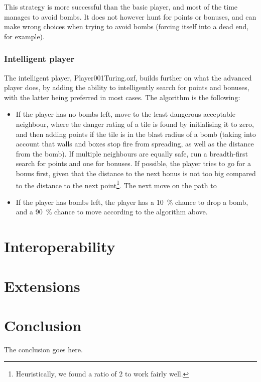 \documentclass[12pt,journal]{IEEEtran}
\newcommand{\ntt}{\normalfont\ttfamily}
\newcommand{\fn}[1]{{\protect\ntt#1}}
\begin{document}
This strategy is more successful than the basic player, and most of the time manages to avoid bombs.
It does not however hunt for points or bonuses, and can make wrong choices when trying to avoid bombs (forcing itself into a dead end, for example).

\subsubsection{Intelligent player}
The intelligent player, \fn{Player001Turing.ozf}, builds further on what the advanced player does, by adding the ability to intelligently search for points and bonuses, with the latter being preferred in most cases.
The algorithm is the following:
\begin{itemize}
	\item If the player has no bombs left, move to the least dangerous acceptable neighbour, where the danger rating of a tile is found by initialising it to zero, and then adding points if the tile is in the blast radius of a bomb (taking into account that walls and boxes stop fire from spreading, as well as the distance from the bomb).
	If multiple neighbours are equally safe, run a breadth-first search for points and one for bonuses.
	If possible, the player tries to go for a bonus first, given that the distance to the next bonus is not too big compared to the distance to the next point\footnote{Heuristically, we found a ratio of \(2\) to work fairly well.}.
	The next move on the path to 
	\item If the player has bombs left, the player has a \SI{10}{\percent} chance to drop a bomb, and a \SI{90}{\percent} chance to move according to the algorithm above.
\end{itemize}

\section{Interoperability}

\section{Extensions}

\section{Conclusion}
The conclusion goes here.

\end{document}
